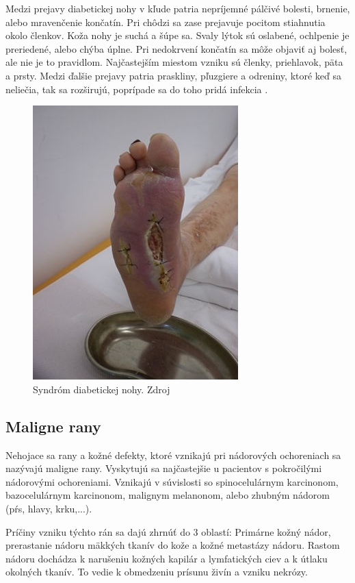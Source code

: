 Medzi prejavy diabetickej nohy v kľude patria nepríjemné pálčivé bolesti, brnenie, alebo mravenčenie končatín. Pri chôdzi sa zase prejavuje pocitom stiahnutia okolo členkov. Koža nohy je suchá a šúpe sa. Svaly lýtok sú oslabené, ochlpenie je preriedené, alebo chýba úplne. Pri nedokrvení končatín sa môže objaviť aj bolesť, ale nie je to pravidlom. Najčastejším miestom vzniku sú členky, priehlavok, päta a prsty. Medzi ďalšie prejavy patria praskliny, pľuzgiere a odreniny, ktoré keď sa neliečia, tak sa rozširujú, poprípade sa do toho pridá infekcia \cite{pcCdSrbbhhlr5YcQ, Pokorna2012}.
\begin{figure}[h]
  \centering
  \includegraphics[scale=2]{fig/diabeticka-noha.jpg}
  \caption{Syndróm diabetickej nohy. Zdroj \cite{uGOum7N9LzIGa5X2}}
  \label{fig:diabeticka-noha}
\end{figure}

\subsection{Maligne rany}
Nehojace sa rany a kožné defekty, ktoré vznikajú pri nádorových ochoreniach sa nazývajú maligne rany. Vyskytujú sa najčastejšie u pacientov s pokročilými nádorovými ochoreniami. Vznikajú v súvislosti so spinocelulárnym karcinonom, bazocelulárnym karcinonom, malignym melanonom, alebo zhubným nádorom (pŕs, hlavy, krku,...).

Príčiny vzniku týchto rán sa dajú zhrnúť do 3 oblastí: Primárne kožný nádor, prerastanie nádoru mäkkých tkanív do kože a kožné metastázy nádoru. Rastom nádoru dochádza k narušeniu kožných kapilár a lymfatických ciev a k útlaku okolných tkanív. To vedie k obmedzeniu prísunu živín a vzniku nekrózy.


